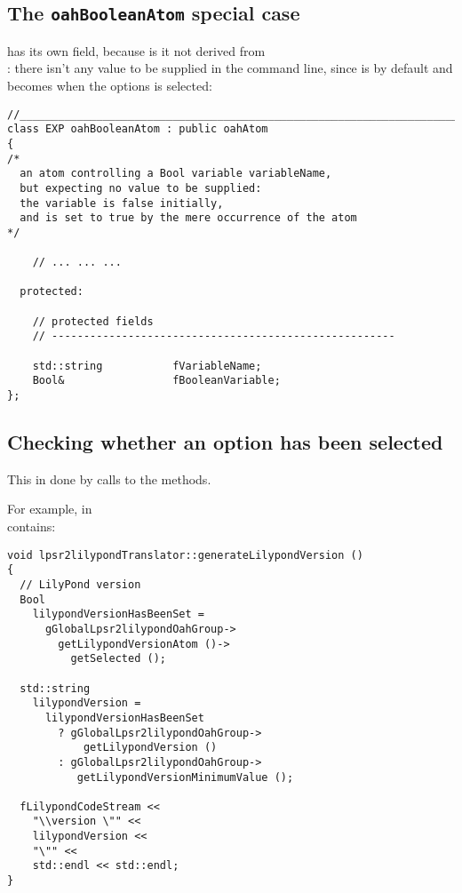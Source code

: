 \subsection{The {\tt oahBooleanAtom} special case}

 has its own  field, because is it not derived from\\
: there isn't any value to be supplied in the command line, since  is  by default and becomes  when the options is selected:
\begin{lstlisting}[language=CPlusPlus]
//______________________________________________________________________________
class EXP oahBooleanAtom : public oahAtom
{
/*
  an atom controlling a Bool variable variableName,
  but expecting no value to be supplied:
  the variable is false initially,
  and is set to true by the mere occurrence of the atom
*/

	// ... ... ...

  protected:

    // protected fields
    // ------------------------------------------------------

    std::string           fVariableName;
    Bool&                 fBooleanVariable;
};
\end{lstlisting}


\subsection{Checking whether an option has been selected}

This in done by calls to the  methods.

For example,  in \\
 contains:
\begin{lstlisting}[language=CPlusPlus]
void lpsr2lilypondTranslator::generateLilypondVersion ()
{
  // LilyPond version
  Bool
    lilypondVersionHasBeenSet =
      gGlobalLpsr2lilypondOahGroup->
        getLilypondVersionAtom ()->
          getSelected ();

  std::string
    lilypondVersion =
      lilypondVersionHasBeenSet
        ? gGlobalLpsr2lilypondOahGroup->
            getLilypondVersion ()
        : gGlobalLpsr2lilypondOahGroup->
           getLilypondVersionMinimumValue ();

  fLilypondCodeStream <<
    "\\version \"" <<
    lilypondVersion <<
    "\"" <<
    std::endl << std::endl;
}
\end{lstlisting}

